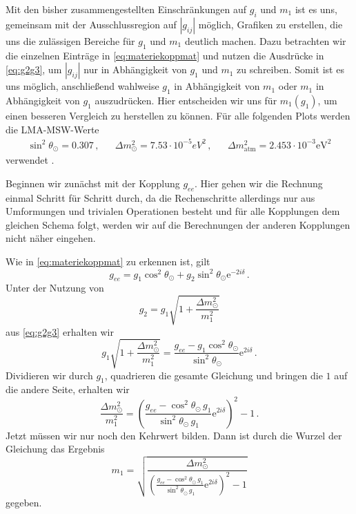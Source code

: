 Mit den bisher zusammengestellten Einschränkungen auf $g_i$ und $m_1$ ist es uns, gemeinsam mit der Ausschlussregion auf $|g_{i j}|$ möglich, Grafiken zu erstellen, die uns die zulässigen Bereiche für $g_1$ und $m_1$ deutlich machen.
Dazu betrachten wir die einzelnen Einträge in \eqref{eq:materiekoppmat} und nutzen die Ausdrücke in \eqref{eq:g2g3}, um $|g_{i j}|$ nur in Abhängigkeit von $g_1$ und $m_1$ zu schreiben.
Somit ist es uns möglich, anschließend wahlweise $g_1$ in Abhängigkeit von $m_1$ oder $m_1$ in Abhängigkeit von $g_1$ auszudrücken.
Hier entscheiden wir uns für $m_1 (g_1)$, um einen besseren Vergleich zu \cite{päspaper} herstellen zu können.
Für alle folgenden Plots werden die LMA-MSW-Werte
\begin{align}
    \sin^2\theta_\odot = \num{0.307}\,, && \Delta m^2_\odot = \num{7.53} \cdot 10^{-5} \si{eV}^2\,, && \Delta m^2_\text{atm} = \num{2.453} \cdot 10^{-3} \si{\eV}^2
    \label{eq:LMAMSW}
\end{align}
verwendet \cite{neutrinospdg}.

Beginnen wir zunächst mit der Kopplung $g_{ee}$.
Hier gehen wir die Rechnung einmal Schritt für Schritt durch, da die Rechenschritte allerdings nur aus Umformungen und trivialen Operationen besteht und für alle Kopplungen dem gleichen Schema folgt, werden wir auf die Berechnungen der anderen
Kopplungen nicht näher eingehen.

Wie in \eqref{eq:materiekoppmat} zu erkennen ist, gilt
\begin{equation}
    g_{ee} = g_1 \cos^2 \theta_\odot + g_2 \sin^2 \theta_\odot \mathrm{e}^{-2 i \delta} \,.
    \label{eq:g_ee}
\end{equation}
Unter der Nutzung von
\begin{equation*}
    g_2 = g_1 \sqrt{1 + \frac{\Delta m^2_\odot}{m^2_1}}
\end{equation*}
aus \eqref{eq:g2g3} erhalten wir
\begin{equation*}
    g_1 \sqrt{1 + \frac{\Delta m^2_\odot}{m^2_1}} = \frac{g_{ee} - g_1 \cos^2 \theta_\odot}{\sin^2 \theta_\odot} \mathrm{e}^{2 i \delta} \,.
\end{equation*}
Dividieren wir durch $g_1$, quadrieren die gesamte Gleichung und bringen die $1$ auf die andere Seite, erhalten wir
\begin{equation*}
    \frac{\Delta m^2_\odot}{m^2_1} = \left(\frac{g_{ee} -  \cos^2 \theta_\odot \, g_1}{\sin^2 \theta_\odot \, g_1} \mathrm{e}^{2 i \delta} \right)^2 - 1 \,.
\end{equation*}
Jetzt müssen wir nur noch den Kehrwert bilden.
Dann ist durch die Wurzel der Gleichung das Ergebnis
\begin{equation}
    m_1 = \sqrt{\frac{\Delta m^2_\odot}{\left(\frac{g_{ee} -  \cos^2 \theta_\odot \, g_1}{\sin^2 \theta_\odot \, g_1} \mathrm{e}^{2 i \delta} \right)^2 - 1}}
    \label{eq:m_1g_ee}
\end{equation}
gegeben.

